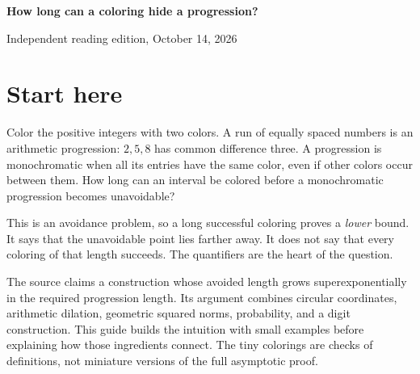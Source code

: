 \documentclass[11pt]{article}
\begin{document}
\begin{center}{\LARGE\bfseries How long can a coloring hide a progression?}\par\vspace{12pt}{\large An illustrated reader for superexponential van der Waerden bounds}\par\vspace{16pt}Independent reading edition, October 14, 2026\end{center}
\section*{Start here}Color the positive integers with two colors. A run of equally spaced numbers is an arithmetic progression: $2,5,8$ has common difference three. A progression is monochromatic when all its entries have the same color, even if other colors occur between them. How long can an interval be colored before a monochromatic progression becomes unavoidable?

This is an avoidance problem, so a long successful coloring proves a \emph{lower} bound. It says that the unavoidable point lies farther away. It does not say that every coloring of that length succeeds. The quantifiers are the heart of the question.

The source claims a construction whose avoided length grows superexponentially in the required progression length. Its argument combines circular coordinates, arithmetic dilation, geometric squared norms, probability, and a digit construction. This guide builds the intuition with small examples before explaining how those ingredients connect. The tiny colorings are checks of definitions, not miniature versions of the full asymptotic proof.
\end{document}
